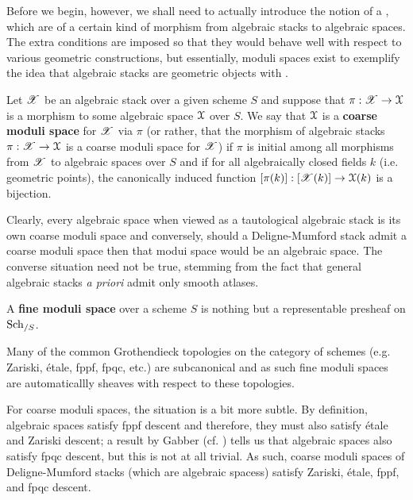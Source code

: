             Before we begin, however, we shall need to actually introduce the notion of a , which are of a certain kind of morphism from algebraic stacks to algebraic spaces. The extra conditions are imposed so that they would behave well with respect to various geometric constructions, but essentially, moduli spaces exist to exemplify the idea that algebraic stacks are geometric objects with .
            \begin{definition} \label{def: coarse_moduli_spaces}
                \cite[Section 1, pp. 1]{conrad_keel_mori_theorem_via_stacks} Let $\mathscr{X}$ be an algebraic stack over a given scheme $S$ and suppose that $\pi: \mathscr{X} \to \mathcal{X}$ is a morphism to some algebraic space $\mathcal{X}$ over $S$. We say that $\mathcal{X}$ is a \textbf{coarse moduli space} for $\mathscr{X}$ via $\pi$ (or rather, that the morphism of algebraic stacks $\pi: \mathscr{X} \to \mathcal{X}$ is a coarse moduli space for $\mathscr{X}$) if $\pi$ is initial among all morphisms from $\mathscr{X}$ to algebraic spaces over $S$ and if for all algebraically closed fields $k$ (i.e. geometric points), the canonically induced function $[\pi(k)]: [\mathscr{X}(k)] \to \mathcal{X}(k)$ is a bijection.  
            \end{definition}
            \begin{remark} \label{remark: (non)representability_of_coarse_moduli_spaces}
                Clearly, every algebraic space when viewed as a tautological algebraic stack is its own coarse moduli space and conversely, should a Deligne-Mumford stack admit a coarse moduli space then that modui space would be an algebraic space. The converse situation need not be true, stemming from the fact that general algebraic stacks \textit{a priori} admit only smooth atlases. 
            \end{remark}
            \begin{definition} \label{def: fine_moduli_spaces}
                A \textbf{fine moduli space} over a scheme $S$ is nothing but a representable presheaf on $\mathrm{Sch}_{/S}$.
            \end{definition}
            \begin{remark} \label{remark: sheafiness_of_moduli_spaces}
                Many of the common Grothendieck topologies on the category of schemes (e.g. Zariski, \'etale, fppf, fpqc, etc.) are subcanonical and as such fine moduli spaces are automaticallly sheaves with respect to these topologies. 
                
                For coarse moduli spaces, the situation is a bit more subtle. By definition, algebraic spaces satisfy fppf descent and therefore, they must also satisfy \'etale and Zariski descent; a result by Gabber (cf. \cite[\href{https://stacks.math.columbia.edu/tag/0APL}{Tag 0APL}]{stacks}) tells us that algebraic spaces also satisfy fpqc descent, but this is not at all trivial. As such, coarse moduli spaces of Deligne-Mumford stacks (which are algebraic spacess) satisfy Zariski, \'etale, fppf, and fpqc descent. 
            \end{remark}
